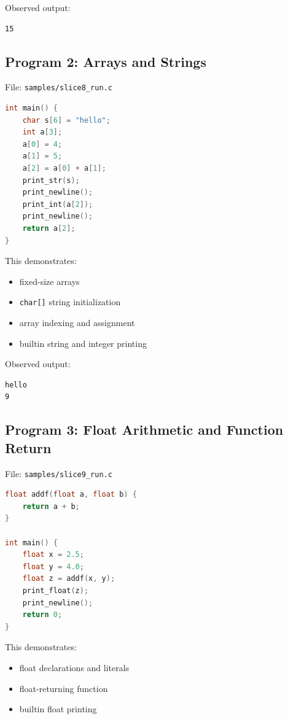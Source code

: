 \documentclass[11pt,a4paper]{article}
\begin{document}
Observed output:

\begin{lstlisting}
15
\end{lstlisting}

\subsection*{Program 2: Arrays and Strings}

File: \texttt{samples/slice8\_run.c}

\begin{lstlisting}[language=C]
int main() {
    char s[6] = "hello";
    int a[3];
    a[0] = 4;
    a[1] = 5;
    a[2] = a[0] + a[1];
    print_str(s);
    print_newline();
    print_int(a[2]);
    print_newline();
    return a[2];
}
\end{lstlisting}

This demonstrates:

\begin{itemize}[leftmargin=2em]
    \item fixed-size arrays
    \item \texttt{char[]} string initialization
    \item array indexing and assignment
    \item builtin string and integer printing
\end{itemize}

Observed output:

\begin{lstlisting}
hello
9
\end{lstlisting}

\subsection*{Program 3: Float Arithmetic and Function Return}

File: \texttt{samples/slice9\_run.c}

\begin{lstlisting}[language=C]
float addf(float a, float b) {
    return a + b;
}

int main() {
    float x = 2.5;
    float y = 4.0;
    float z = addf(x, y);
    print_float(z);
    print_newline();
    return 0;
}
\end{lstlisting}

This demonstrates:

\begin{itemize}[leftmargin=2em]
    \item float declarations and literals
    \item float-returning function
    \item builtin float printing
\end{itemize}
\end{document}
